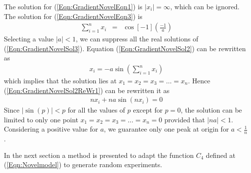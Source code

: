 \documentclass[twocolumn]{svjour3}          %
\begin{document}
The solution for (\ref{Eqn:GradientNovelEqn1}) is $|x_i|=\infty$, which can be ignored. The solution for (\ref{Eqn:GradientNovelEqn3}) is
\begin{eqnarray}
	\sum_{i=1}^{n} x_i &=& \cos[-1](\frac{-1}{a}) \label{Eqn:GradientNovelSol3}
\end{eqnarray}
Selecting a value $|a|<1$, we can suppress all the real solutions of (\ref{Eqn:GradientNovelSol3}). Equation (\ref{Eqn:GradientNovelSol2}) can be rewritten as 
\begin{eqnarray}
	x_i = -a\sin\left(\sum_{i=1}^{n} x_i\right) \label{Eqn:GradientNovelSol2ReWr1}
\end{eqnarray}
which implies that the solution lies at $x_1 = x_2 = x_3 = \dots = x_n$. Hence (\ref{Eqn:GradientNovelSol2ReWr1}) can be rewritten it as
\begin{eqnarray}
	nx_i + na\sin(nx_i) = 0 \label{Eqn:GradientNovelSol2ReWr2}
\end{eqnarray}
Since $|\sin(p)|<p$ for all the values of $p$ except for $p = 0$, the solution can be limited to only one point $x_1 = x_2 = x_3 = \dots = x_n=0$ provided that $|na|<1$. Considering a positive value for $a$, we guarantee only one peak at origin for $a<\frac{1}{n}$.
\par
In the next section a method is presented to adapt the function $C_4$ defined at (\ref{Eqn:Novelmodel}) to generate random experiments.
\end{document}
